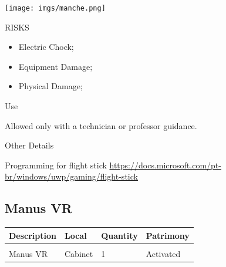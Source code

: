 \begin{multicols}{2}

\texttt{[image: imgs/manche.png]}

\columnbreak

\begin{mdframed}[roundcorner=10pt, linecolor=red, linewidth=2pt]
\vspace{1em}
{\Large {\color{red}RISKS}}
\vspace{1em}

\begin{itemize}
    \item Electric Chock;
    \item Equipment Damage;
    \item Physical Damage;
\end{itemize}

\vspace{1em}
\end{mdframed}

\vspace{2em}

{\Large Use}
\vspace{1em}

Allowed only with a technician or professor guidance.
\end{multicols}

{\Large Other Details}
\vspace{1em}

Programming for flight stick \url{https://docs.microsoft.com/pt-br/windows/uwp/gaming/flight-stick} 
\newpage


\subsection{Manus VR}
\begin{tabularx}{\textwidth}{ Y  Y  Y  Y }
    \textbf{Description} &  \textbf{Local} &  \textbf{Quantity} & \textbf{Patrimony}\\
    \hline \\
     Manus VR & Cabinet & 1 & Activated
\end{tabularx}
\vspace{1cm}

